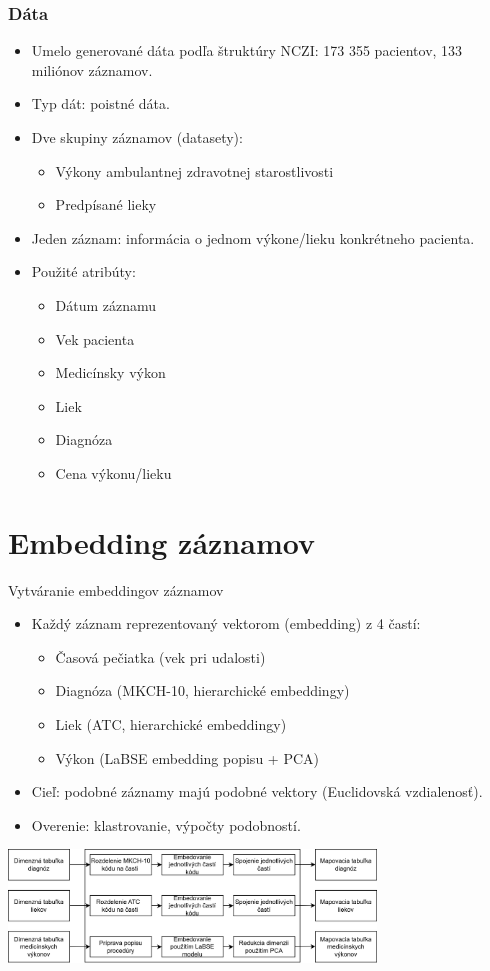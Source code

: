\documentclass[slovak,10pt]{beamer}
\begin{document}
\begin{frame}  
	\frametitle{Dáta}
	\begin{itemize}
		\item<1> Umelo generované dáta podľa štruktúry NCZI: 173 355 pacientov, 133 miliónov záznamov.
		\item<1> Typ dát: poistné dáta.
		\item<1> Dve skupiny záznamov (datasety):
		\begin{itemize}
			\item<1> Výkony ambulantnej zdravotnej starostlivosti
			\item<1> Predpísané lieky
		\end{itemize}
		\item<1> Jeden záznam: informácia o jednom výkone/lieku konkrétneho pacienta.
		\item<1> Použité atribúty:
		\begin{itemize}
			\item<1> Dátum záznamu
			\item<1> Vek pacienta
			\item<1> Medicínsky výkon
			\item<1> Liek 
			\item<1> Diagnóza
			\item<1> Cena výkonu/lieku
		\end{itemize}
	\end{itemize} 
\end{frame}

\section{Embedding záznamov}

\begin{frame}{Vytváranie embeddingov záznamov}
	\begin{itemize}
		\item<1> Každý záznam reprezentovaný vektorom (embedding) z 4 častí:
		\begin{itemize}
			\item<1> Časová pečiatka (vek pri udalosti)
			\item<1> Diagnóza (MKCH-10, hierarchické embeddingy)
			\item<1> Liek (ATC, hierarchické embeddingy)
			\item<1> Výkon (LaBSE embedding popisu + PCA)
		\end{itemize}
		\item<1> Cieľ: podobné záznamy majú podobné vektory (Euclidovská vzdialenosť).
		\item<1> Overenie: klastrovanie, výpočty podobností.
	\end{itemize}
	\begin{center}
		\includegraphics[height=3cm]{images/daig_emb_svk.png}
	\end{center}
\end{frame}
\end{document}
